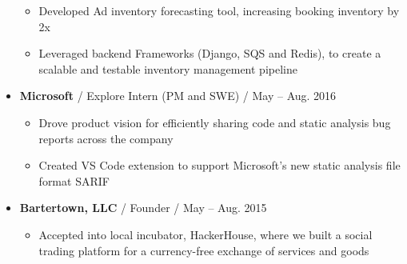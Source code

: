\documentclass[letterpaper,10pt]{article}
\makeatletter
\newcommand{\resitem}[1]{\item #1 \vspace{-3pt}}
\newcommand{\ressubheading}[4]{
\begin{tabular*}{7.0in}{l@{\extracolsep{\fill}}r}
		\textbf{#1} & #2 \\
		\textit{#3} & \textit{#4} \\
\end{tabular*}\vspace{-6pt}}
\newcommand{\singlesubheading}[3]{ \textbf{#1} / #2 / #3 \vspace{-2pt}}
\makeatother
\begin{document}
\begin{itemize}
\begin{itemize}
        \resitem{Developed Ad inventory forecasting tool, increasing booking inventory by 2x}
        \resitem{Leveraged backend Frameworks (Django, SQS and Redis), to create a scalable and testable inventory management pipeline}
    \end{itemize}
\item[]
	\singlesubheading{Microsoft}{Explore Intern (PM and SWE)}{May -- Aug. 2016}
    \begin{itemize}
        \resitem{Drove product vision for efficiently sharing code and static analysis bug reports across the company}
		\resitem{Created VS Code extension to support Microsoft's new static analysis file format SARIF}
    \end{itemize}
\item[]
	\singlesubheading{Bartertown, LLC}{Founder}{May -- Aug. 2015}
    \begin{itemize}
        \resitem{Accepted into local incubator, HackerHouse, where we built a social trading platform for a currency-free exchange of services and goods}
    \end{itemize}
\end{itemize}
\end{document}
